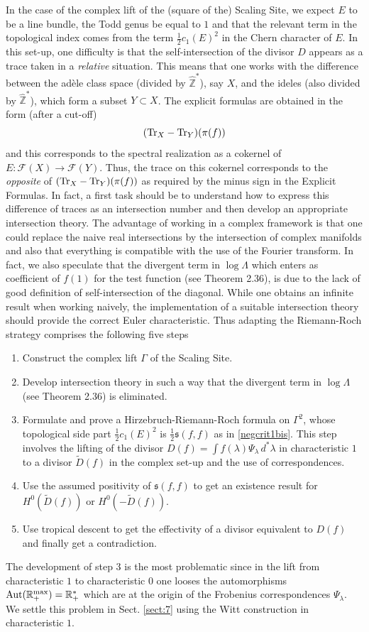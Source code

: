 \documentclass[graybox, envcountsect%
]{svmult}
\def\inter{{\mathfrak s}}
\def\Aut{{\rm Aut}}
\def\Tr{{\rm Tr}}
\def\R{{\mathbb R}}
\def\Z{{\mathbb Z}}
\def\Tr{{\rm Tr}}
\def\cF{{\mathcal F}}
\def\rmax{\R_+^{\rm max}}
\begin{document}
In the case of the complex lift of the (square of the) Scaling Site, we expect  $E$ to be a line bundle, the Todd genus  be equal to $1$ and that the relevant term in the topological index  comes from the term $\frac 12 c_1(E)^2$ in the Chern character of $E$.\newline
In this set-up, one difficulty is that the self-intersection of the divisor $D$ appears
as a trace taken in a \emph{relative} situation. This means that one works with the difference between the ad\`ele class space (divided by $\hat\Z^*$), say $X$, and the ideles (also divided by $\hat\Z^*$), which form a subset $Y\subset X$. The explicit formulas are obtained in the form (after a cut-off) 
$$
(\Tr_X-\Tr_Y)(\pi(f))
$$
and this corresponds to the spectral realization as a cokernel of $E:\cF(X)\to \cF(Y)$. Thus, the trace on this cokernel corresponds to the {\em opposite} of $(\Tr_X-\Tr_Y)(\pi(f))$ as required by the minus sign in the Explicit Formulas. In fact, a first task should be to understand how to express this difference of traces as an intersection number and then develop an appropriate intersection theory. The  advantage of working   in a complex framework is that one could replace the naive real intersections by the intersection of complex manifolds and also that everything is compatible with the use of the Fourier transform. In fact, we also speculate that the divergent term in $\log \Lambda$ which enters as coefficient of $f(1)$ for the test function (see \cite{cmbook} Theorem 2.36), is due to the lack of good definition of self-intersection of the diagonal. While one obtains an infinite result when working naively, the implementation of a suitable intersection theory should provide the correct Euler characteristic.
Thus adapting  the Riemann-Roch strategy comprises the following five steps
\begin{enumerate}
\item Construct the complex lift $\Gamma$ of the Scaling Site.
\item Develop intersection theory  in such a way that the divergent term in $\log \Lambda$ (see \cite{cmbook} Theorem 2.36) is eliminated.
\item Formulate and prove a Hirzebruch-Riemann-Roch formula on $\Gamma^2$,  whose topological side part $\frac 12 c_1(E)^2$ is $\frac 12\inter(f,f)$ as in \eqref{negcrit1bis}. This step involves the lifting of the divisor $D(f)=\int f(\lambda) \Psi_{\lambda}\, d^*\lambda$ in characteristic $1$ to a divisor $\tilde D(f)$ in the complex set-up and the use of correspondences.
\item Use the assumed positivity of $\inter(f,f)$ to get an existence result for $H^0(\tilde D(f))$ or 
 $H^0(-\tilde D(f))$.
 \item Use tropical descent to get the effectivity of a divisor equivalent to $D(f)$ and finally get a contradiction.	\end{enumerate}
 The development of step 3 is the most problematic since in the lift from characteristic $1$ to characteristic $0$ one looses the automorphisms $\Aut(\rmax)=\R_+^*$ which are at the origin of the Frobenius correspondences $\Psi_{\lambda}$. We settle this problem in Sect. \ref{sect:7} using the Witt construction in characteristic $1$. 
\end{document}
